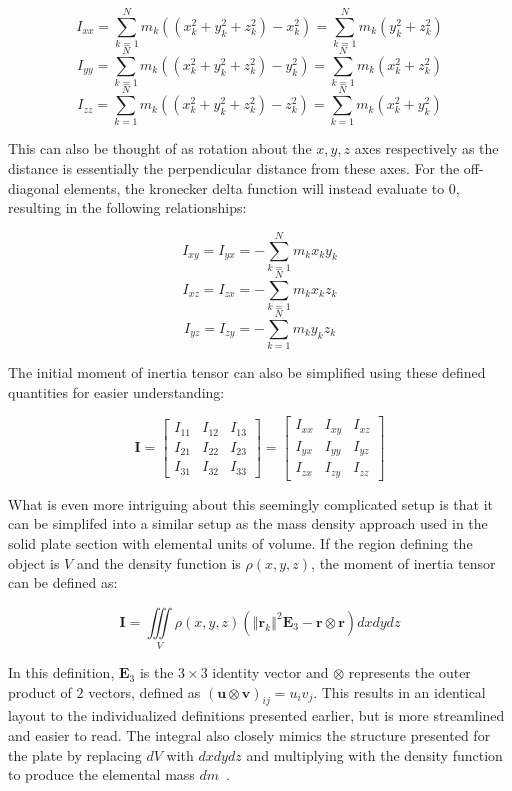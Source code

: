 \[I_{xx} = \sum_{k=1}^N m_k((x_k^2 + y_k^2 + z_k^2) - x_k^2) = \sum_{k=1}^N m_k(y_k^2 + z_k^2)\]
\[I_{yy} = \sum_{k=1}^N m_k((x_k^2 + y_k^2 + z_k^2) - y_k^2) = \sum_{k=1}^N m_k(x_k^2 + z_k^2)\]
\[I_{zz} = \sum_{k=1}^N m_k((x_k^2 + y_k^2 + z_k^2) - z_k^2) = \sum_{k=1}^N m_k(x_k^2 + y_k^2)\]

This can also be thought of as rotation about the $x, y, z$ axes respectively as the distance is essentially the perpendicular distance from these axes. For the off-diagonal elements, the kronecker delta function will instead evaluate to $0$, resulting in the following relationships:

\[I_{xy} = I_{yx} = -\sum_{k=1}^N m_kx_ky_k\]
\[I_{xz} = I_{zx} = -\sum_{k=1}^N m_kx_kz_k\]
\[I_{yz} = I_{zy} = -\sum_{k=1}^N m_ky_kz_k\]

The initial moment of inertia tensor can also be simplified using these defined quantities for easier understanding:

\[\bm{I} = \begin{bmatrix}I_{11} & I_{12} & I_{13} \\ I_{21} & I_{22} & I_{23} \\ I_{31} & I_{32} & I_{33}\end{bmatrix} = \begin{bmatrix}I_{xx} & I_{xy} & I_{xz} \\ I_{yx} & I_{yy} & I_{yz} \\ I_{zx} & I_{zy} & I_{zz}\end{bmatrix}\]

What is even more intriguing about this seemingly complicated setup is that it can be simplifed into a similar setup as the mass density approach used in the solid plate section with elemental units of volume. If the region defining the object is $V$ and the density function is $\rho(x,y,z)$, the moment of inertia tensor can be defined as:

\begin{equation}
\bm{I} = \iiint\limits_{V} \rho(x,y,z)(\left\Vert \bm{r}_k \right\Vert^2\bm{E}_3 - \bm{r} \otimes \bm{r})dxdydz
\label{eq:inertia_tensor_integral}
\end{equation}

In this definition, $\bm{E}_3$ is the $3 \times 3$ identity vector and $\otimes$ represents the outer product of $2$ vectors, defined as $(\bm{u} \otimes \bm{v})_{ij} = u_iv_j$. This results in an identical layout to the individualized definitions presented earlier, but is more streamlined and easier to read. The integral also closely mimics the structure presented for the plate by replacing $dV$ with $dxdydz$ and multiplying with the density function to produce the elemental mass $dm$~\parencite{Thornton_Marion_2004}.

